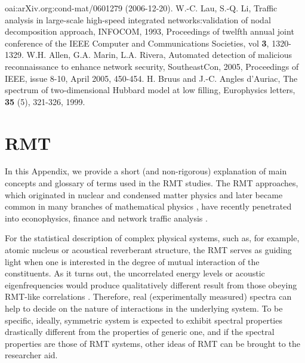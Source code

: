 \documentclass{IEEEtran}
\begin{document}
\begin{thebibliography}{10}
oai:arXiv.org:cond-mat/0601279 (2006-12-20).
W.-C. Lau, S.-Q. Li, Traffic analysis in large-scale high-speed integrated
networks:validation of nodal decomposition approach, INFOCOM, 1993,
Proceedings of twelfth annual joint conference of the IEEE Computer
and Communications Societies, vol \textbf{3}, 1320-1329.
W.H. Allen, G.A. Marin, L.A. Rivera, Automated detection of malicious
reconnaissance to enhance network security, SoutheastCon, 2005, Proceedings
of IEEE, issue 8-10, April 2005, 450-454.
H. Bruus and J.-C. Angles d'Auriac, The spectrum of two-dimensional
Hubbard model at low filling, Europhysics letters, \textbf{35} (5),
321-326, 1999.
\end{thebibliography}
\appendix

\section{RMT}

In this Appendix, we provide a short (and non-rigorous) explanation
of main concepts and glossary of terms used in the RMT studies. The
RMT approaches, which originated in nuclear and condensed matter physics
and later became common in many branches of mathematical physics \cite{Stockman},
have recently penetrated into econophysics, finance \cite{Bouchaud}
and network traffic analysis \cite{Barthelemy}. 

For the statistical description of complex physical systems, such
as, for example, atomic nucleus or acoustical reverberant structure,
the RMT serves as guiding light when one is interested in the degree
of mutual interaction of the constituents. As it turns out, the uncorrelated
energy levels or acoustic eigenfrequencies would produce qualitatively
different result from those obeying RMT-like correlations \cite{Stockman}.
Therefore, real (experimentally measured) spectra can help to decide
on the nature of interactions in the underlying system. To be specific,
ideally, symmetric system is expected to exhibit spectral properties
drastically different from the properties of generic one, and if the
spectral properties are those of RMT systems, other ideas of RMT can
be brought to the researcher aid.
\end{document}
